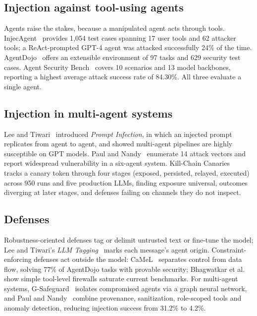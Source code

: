 \documentclass[11pt]{article}
\begin{document}
\subsection{Injection against tool-using agents}
Agents raise the stakes, because a manipulated agent acts through tools. InjecAgent~\cite{zhan2024injecagent} provides 1{,}054 test cases spanning 17 user tools and 62 attacker tools; a ReAct-prompted GPT-4 agent was attacked successfully 24\% of the time. AgentDojo~\cite{debenedetti2024agentdojo} offers an extensible environment of 97 tasks and 629 security test cases. Agent Security Bench~\cite{zhang2025asb} covers 10 scenarios and 13 model backbones, reporting a highest average attack success rate of 84.30\%. All three evaluate a single agent.

\subsection{Injection in multi-agent systems}
Lee and Tiwari~\cite{lee2024infection} introduced \emph{Prompt Infection}, in which an injected prompt replicates from agent to agent, and showed multi-agent pipelines are highly susceptible on GPT models. Paul and Nandy~\cite{paul2026beyond} enumerate 14 attack vectors and report widespread vulnerability in a six-agent system. Kill-Chain Canaries~\cite{wang2026killchain} tracks a canary token through four stages (exposed, persisted, relayed, executed) across 950 runs and five production LLMs, finding exposure universal, outcomes diverging at later stages, and defenses failing on channels they do not inspect.

\subsection{Defenses}
Robustness-oriented defenses tag or delimit untrusted text or fine-tune the model; Lee and Tiwari's \emph{LLM Tagging}~\cite{lee2024infection} marks each message's agent origin. Constraint-enforcing defenses act outside the model: CaMeL~\cite{debenedetti2025camel} separates control from data flow, solving 77\% of AgentDojo tasks with provable security; Bhagwatkar et al.~\cite{bhagwatkar2025firewalls} show simple tool-level firewalls saturate current benchmarks. For multi-agent systems, G-Safeguard~\cite{wang2025gsafeguard} isolates compromised agents via a graph neural network, and Paul and Nandy~\cite{paul2026beyond} combine provenance, sanitization, role-scoped tools and anomaly detection, reducing injection success from 31.2\% to 4.2\%.
\end{document}
